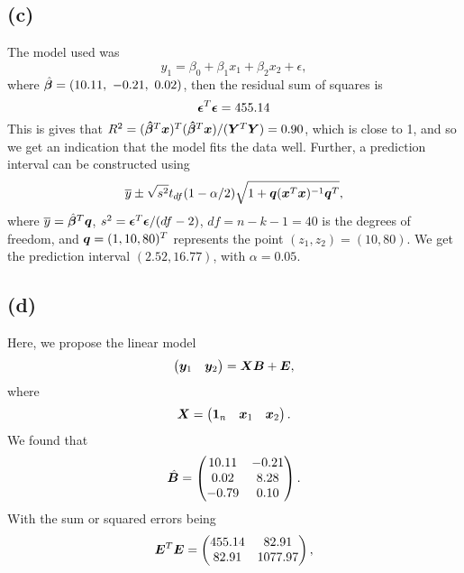 \subsection*{(c)}
\label{sec:c-4}

The model used was
\begin{equation*}
  y_1 = \beta_0 + \beta_1 x_1 + \beta_2 x_2 + \epsilon,
\end{equation*}
where $\hat{\bm{\beta}} = (10.11,\   -0.21,\    0.02)$, then the
residual sum of squares is
\begin{equation*}
  \bm{\epsilon}^{T} \bm{\epsilon} = 455.14
\end{equation*}
This is gives that $R^{2} = (\bm{\hat}{\bm{\beta}}^{T} \bm{x})^{T} (\bm{\hat}{\bm{\beta}}^{T} \bm{x})/(\bm{Y}^{T} \bm{Y}) = 0.90$, which is close to 1, and so
we get an indication that the model fits the data well. 
Further, a prediction interval can be constructed using
\begin{equation*}
  \overline y \pm \sqrt{s^{2}}t_{df}(1 - \alpha/2)\sqrt{1 + \bm{q} (\bm{x}^{T} \bm{x})^{-1}\bm{q}^{T}},
\end{equation*}
where $\overline y = \hat{\bm{\beta}}^{T} \bm{q}$, $s^{2} =\bm{\epsilon}^{T} \bm{\epsilon} / (df - 2) $, $df = n - k - 1
= 40$ is the degrees of freedom, and $\bm{q} = (1, 10, 80)^{T}$ represents
the point $(z_{1}, z_{2}) = (10, 80)$.  We get the prediction interval $(2.52, 16.77)$, with $\alpha = 0.05$.
\subsection*{(d)}

Here, we propose the linear model
\begin{equation*}
  \begin{pmatrix}
    \bm{y}_1 & \bm{y}_2
  \end{pmatrix} = 
  \bm{X}\bm{B} + \bm{E},
\end{equation*}
where 
\begin{equation*}
 \bm{X} =
  \begin{pmatrix}
    \bm{1}_n & \bm{x}_1 & \bm{x}_2
  \end{pmatrix}.
\end{equation*}
We found that
\begin{equation*}
 \hat{\bm{B}} =
  \begin{pmatrix}
    10.11 & -0.21 \\ 
    0.02 & 8.28 \\ 
    -0.79 & 0.10 
  \end{pmatrix}.
\end{equation*}
With the sum or squared errors being
\begin{equation*}
  \bm{E} ^{T} \bm{E} = 
  \begin{pmatrix}
    455.14 &82.91 \\ 
    82.91 &1077.97
  \end{pmatrix},
\end{equation*}

